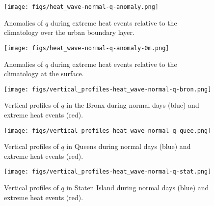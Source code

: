\documentclass[num-refs]{wiley-article}
\begin{document}
\begin{figure}[ht]
	\centering
	\texttt{[image: figs/heat\_wave-normal-q-anomaly.png]}
	\caption{Anomalies of $q$ during extreme heat events relative to the climatology over the urban boundary layer.}
	\label{fig:extreme-heat-normal-comparison-contours-q}
\end{figure}
\begin{figure}[ht]
	\centering
	\texttt{[image: figs/heat\_wave-normal-q-anomaly-0m.png]}
	\caption{Anomalies of $q$ during extreme heat events relative to the climatology at the surface.}
	\label{fig:extreme-heat-normal-0m-comparison-q}
\end{figure}
\begin{figure}[ht]
	\centering
	\texttt{[image: figs/vertical\_profiles-heat\_wave-normal-q-bron.png]}
	\caption{Vertical profiles of $q$ in the Bronx during normal days (blue) and extreme heat events (red).}
	\label{fig:vertical_profiles-heat_wave-normal-q-bron}
\end{figure}
\begin{figure}[ht]
	\centering
	\texttt{[image: figs/vertical\_profiles-heat\_wave-normal-q-quee.png]}
	\caption{Vertical profiles of $q$ in Queens during normal days (blue) and extreme heat events (red).}
	\label{fig:vertical_profiles-heat_wave-normal-q-quee}
\end{figure}
\begin{figure}[ht]
	\centering
	\texttt{[image: figs/vertical\_profiles-heat\_wave-normal-q-stat.png]}
	\caption{Vertical profiles of $q$ in Staten Island during normal days (blue) and extreme heat events (red).}
	\label{fig:vertical_profiles-heat_wave-normal-q-stat}
\end{figure}
\end{document}
